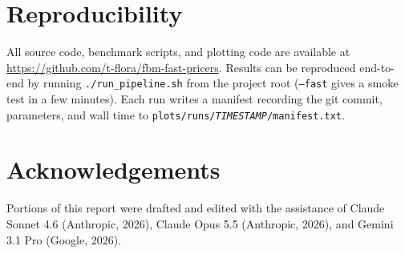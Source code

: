 \documentclass{article}
\begin{document}
\medskip



\appendix
\section*{Reproducibility}
All source code, benchmark scripts, and plotting code are available at
\url{https://github.com/t-flora/fbm-fast-pricers}.  Results can be reproduced
end-to-end by running \texttt{./run\_pipeline.sh} from the project root
(\texttt{--fast} gives a smoke test in a few minutes).  Each run writes a manifest
recording the git commit, parameters, and wall time to
\texttt{plots/runs/\textit{TIMESTAMP}/\allowbreak manifest.txt}.

\section*{Acknowledgements}
Portions of this report were drafted and edited with the assistance of Claude Sonnet 4.6
(Anthropic, 2026), Claude Opus 5.5 (Anthropic, 2026), and Gemini 3.1 Pro (Google, 2026).
\end{document}
